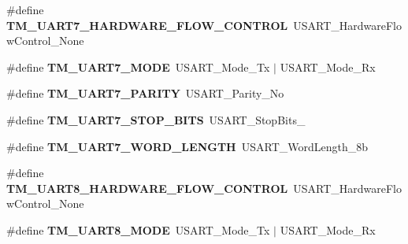\begin{DoxyCompactItemize}
\item 
\hypertarget{group___t_m___u_s_a_r_t___macros_ga9425072e41c5de1d2002e8717b5b4b0c}{}\#define {\bfseries T\+M\+\_\+\+U\+A\+R\+T7\+\_\+\+H\+A\+R\+D\+W\+A\+R\+E\+\_\+\+F\+L\+O\+W\+\_\+\+C\+O\+N\+T\+R\+O\+L}~U\+S\+A\+R\+T\+\_\+\+Hardware\+Flow\+Control\+\_\+\+None\label{group___t_m___u_s_a_r_t___macros_ga9425072e41c5de1d2002e8717b5b4b0c}

\item 
\hypertarget{group___t_m___u_s_a_r_t___macros_ga3bab444d57399bf0249b6670aa0a34a7}{}\#define {\bfseries T\+M\+\_\+\+U\+A\+R\+T7\+\_\+\+M\+O\+D\+E}~U\+S\+A\+R\+T\+\_\+\+Mode\+\_\+\+Tx $\vert$ U\+S\+A\+R\+T\+\_\+\+Mode\+\_\+\+Rx\label{group___t_m___u_s_a_r_t___macros_ga3bab444d57399bf0249b6670aa0a34a7}

\item 
\hypertarget{group___t_m___u_s_a_r_t___macros_ga73ab88cc88367d48622c007037ec451b}{}\#define {\bfseries T\+M\+\_\+\+U\+A\+R\+T7\+\_\+\+P\+A\+R\+I\+T\+Y}~U\+S\+A\+R\+T\+\_\+\+Parity\+\_\+\+No\label{group___t_m___u_s_a_r_t___macros_ga73ab88cc88367d48622c007037ec451b}

\item 
\hypertarget{group___t_m___u_s_a_r_t___macros_gad63f4ff54176c6e05afd3495489889de}{}\#define {\bfseries T\+M\+\_\+\+U\+A\+R\+T7\+\_\+\+S\+T\+O\+P\+\_\+\+B\+I\+T\+S}~U\+S\+A\+R\+T\+\_\+\+Stop\+Bits\+\_\label{group___t_m___u_s_a_r_t___macros_gad63f4ff54176c6e05afd3495489889de}

\item 
\hypertarget{group___t_m___u_s_a_r_t___macros_gaf0983cdb6ed0fa4e2e0a82691a2621dd}{}\#define {\bfseries T\+M\+\_\+\+U\+A\+R\+T7\+\_\+\+W\+O\+R\+D\+\_\+\+L\+E\+N\+G\+T\+H}~U\+S\+A\+R\+T\+\_\+\+Word\+Length\+\_\+8b\label{group___t_m___u_s_a_r_t___macros_gaf0983cdb6ed0fa4e2e0a82691a2621dd}

\item 
\hypertarget{group___t_m___u_s_a_r_t___macros_ga31343b3a6e841e728b0558b8fd0c9750}{}\#define {\bfseries T\+M\+\_\+\+U\+A\+R\+T8\+\_\+\+H\+A\+R\+D\+W\+A\+R\+E\+\_\+\+F\+L\+O\+W\+\_\+\+C\+O\+N\+T\+R\+O\+L}~U\+S\+A\+R\+T\+\_\+\+Hardware\+Flow\+Control\+\_\+\+None\label{group___t_m___u_s_a_r_t___macros_ga31343b3a6e841e728b0558b8fd0c9750}

\item 
\hypertarget{group___t_m___u_s_a_r_t___macros_ga5343e5612044e58f6753e4b27069421f}{}\#define {\bfseries T\+M\+\_\+\+U\+A\+R\+T8\+\_\+\+M\+O\+D\+E}~U\+S\+A\+R\+T\+\_\+\+Mode\+\_\+\+Tx $\vert$ U\+S\+A\+R\+T\+\_\+\+Mode\+\_\+\+Rx\label{group___t_m___u_s_a_r_t___macros_ga5343e5612044e58f6753e4b27069421f}


\end{DoxyCompactItemize}

